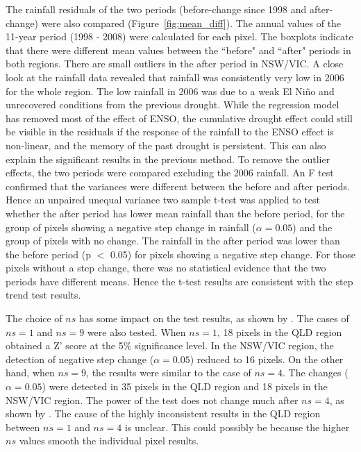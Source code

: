 \documentclass[draft,linenumbers]{agujournal}
\begin{document}
\begin{article}
The rainfall residuals of the two periods (before-change since 1998 and after-change) were also compared (Figure~\ref{fig:mean_diff}). The annual values of the 11-year period (1998 - 2008) were calculated for each pixel. The boxplots indicate that there were different mean values between the ``before" and ``after" periods in both regions. There are small outliers in the after period in NSW/VIC. A close look at the rainfall data revealed that rainfall was consistently very low in 2006 for the whole region. The low rainfall in 2006 was due to a weak El Ni\~{n}o and unrecovered conditions from the previous drought. While the regression model has removed most of the effect of ENSO, the  cumulative drought effect could still be visible in the residuals if the response of the rainfall to the ENSO effect is non-linear, and the memory of the past drought is persistent. This can also explain the significant results in the previous method. To remove the outlier effects, the two periods were compared excluding the 2006 rainfall. An F test confirmed that the variances were different between the before and after periods. Hence an unpaired unequal variance two sample t-test was applied to test whether the after period has lower mean rainfall than the before period, for the group of pixels showing a negative step change in rainfall ($\alpha = 0.05$) and the group of pixels with no change. The rainfall in the after period was lower than the before period (p $<$ 0.05) for pixels showing a negative step change. For those pixels without a step change, there was no statistical evidence that the two periods have different means. Hence the t-test results are consistent with the step trend test results.


The choice of $ns$ has some impact on the test results, as shown by \citet{Hirsch1985}. The cases of $ns = 1$ and $ns = 9$ were also tested. When $ns = 1$, 18 pixels in the QLD region obtained a Z' score at the 5\% significance level. In the NSW/VIC region, the detection of negative step change ($\alpha = 0.05$) reduced to 16 pixels. On the other hand, when $ns = 9$, the results were similar to the case of $ns = 4$. The changes ($\alpha = 0.05$) were detected in 35 pixels in the QLD region and 18 pixels in the NSW/VIC region. The power of the test does not change much after $ns = 4$, as shown by \citet{Hirsch1985}. The cause of the highly inconsistent results in the QLD region between $ns = 1$ and $ns = 4$ is unclear. This could possibly be because the higher $ns$ values smooth the individual pixel results.


\end{article}
\end{document}
